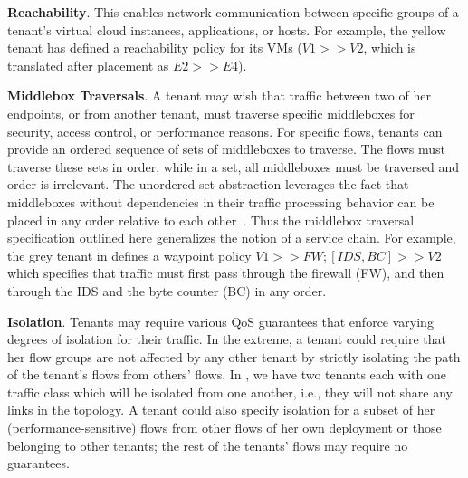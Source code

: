 \begin{compactitemize}
\item \textbf{Reachability}. This enables network communication
  between specific groups of a tenant's virtual cloud instances,
  applications, or hosts. For example, the yellow tenant has defined a reachability
  policy for its VMs ($V1 >> V2$, which is translated  after 
  placement as $E2 >> E4$).
\item \textbf{Middlebox Traversals}. A tenant may wish that traffic
  between two of her endpoints, or from another tenant, must traverse
   specific middleboxes %
   for
  security, access control, or performance reasons. For specific
  flows, tenants can provide
  an ordered sequence of sets of middleboxes
  to traverse. The flows must traverse these sets in order,
  while in a set, all middleboxes must be traversed
  and order is irrelevant.  The
  unordered set abstraction leverages the fact that middleboxes
  without dependencies in their traffic processing behavior can be
  placed in any order relative to each other~\cite{pga}. Thus the
  middlebox traversal specification outlined here generalizes the
  notion of a service chain. For example, the grey tenant in 
  defines a waypoint policy $V1 >> FW; [IDS,BC] >> V2$
   which specifies that traffic must first pass through the firewall (FW),
  and then through the IDS and the byte counter (BC) in any order. 


\item \textbf{Isolation}. Tenants may require various QoS guarantees
  that enforce varying degrees of isolation for their traffic. In the
  extreme, a tenant could require that her flow groups are not affected
  by any other tenant by strictly isolating the path of the tenant's
  flows from others' flows. In , we have two tenants
  each with one traffic class which will be isolated from one another, i.e.,
  they will not share any links in the topology. 
  A tenant could also specify isolation for a subset of her
  (performance-sensitive) flows from other flows of her own deployment
  or those belonging to other tenants; the rest of the tenants' flows
  may require no guarantees.


\end{compactitemize}
